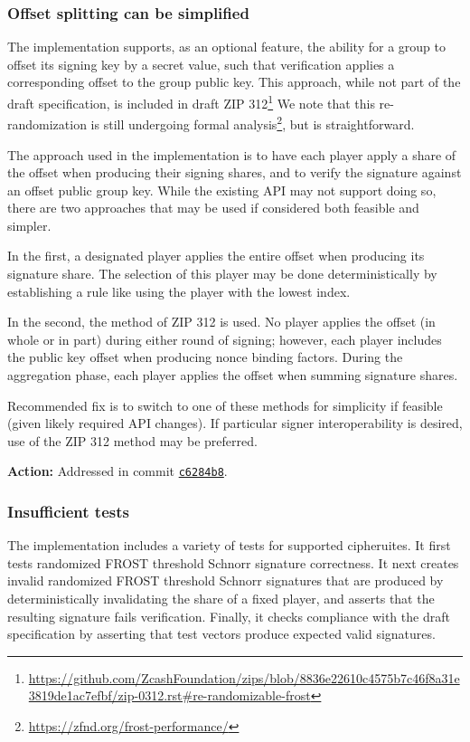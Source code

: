 \documentclass{article}
\begin{document}
\subsubsection{Offset splitting can be simplified}

The implementation supports, as an optional feature, the ability for a group to offset its signing key by a secret value, such that verification applies a corresponding offset to the group public key.
This approach, while not part of the draft specification, is included in draft ZIP 312\footnote{\url{https://github.com/ZcashFoundation/zips/blob/8836e22610c4575b7c46f8a31e3819de1ac7efbf/zip-0312.rst\#re-randomizable-frost}}
We note that this re-randomization is still undergoing formal analysis\footnote{\url{https://zfnd.org/frost-performance/}}, but is straightforward.

The approach used in the implementation is to have each player apply a share of the offset when producing their signing shares, and to verify the signature against an offset public group key.
While the existing API may not support doing so, there are two approaches that may be used if considered both feasible and simpler.

In the first, a designated player applies the entire offset when producing its signature share.
The selection of this player may be done deterministically by establishing a rule like using the player with the lowest index.

In the second, the method of ZIP 312 is used.
No player applies the offset (in whole or in part) during either round of signing; however, each player includes the public key offset when producing nonce binding factors.
During the aggregation phase, each player applies the offset when summing signature shares.

Recommended fix is to switch to one of these methods for simplicity if feasible (given likely required API changes).
If particular signer interoperability is desired, use of the ZIP 312 method may be preferred.

\textbf{Action:} Addressed in commit \href{https://github.com/serai-dex/serai/commit/c6284b85a4c3ccb91e336f30cda9b11d0b6bea9f}{\texttt{c6284b8}}.


\subsubsection{Insufficient tests}

The implementation includes a variety of tests for supported cipheruites.
It first tests randomized FROST threshold Schnorr signature correctness.
It next creates invalid randomized FROST threshold Schnorr signatures that are produced by deterministically invalidating the share of a fixed player, and asserts that the resulting signature fails verification.
Finally, it checks compliance with the draft specification by asserting that test vectors produce expected valid signatures.
\end{document}
